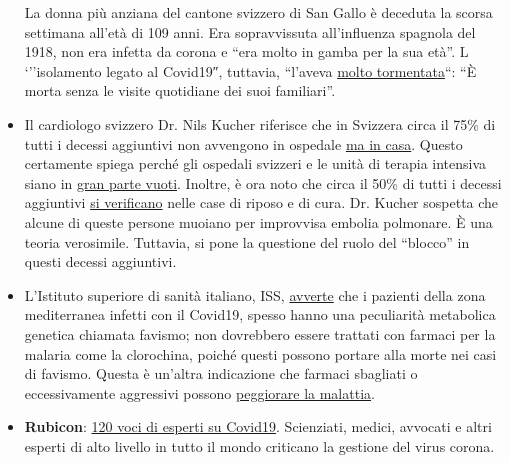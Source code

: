 \begin{itemize}
  La donna più anziana del cantone svizzero di San Gallo è deceduta la
  scorsa settimana all'età di 109 anni. Era sopravvissuta all'influenza
  spagnola del 1918, non era infetta da corona e ``era molto in gamba
  per la sua età''. L `''isolamento legato al Covid19″, tuttavia,
  ``l'aveva
  \href{https://swprs.files.wordpress.com/2020/04/tagblatt-109.jpg}{molto
  tormentata}``: ``È morta senza le visite quotidiane dei suoi
  familiari''.
\item
  Il cardiologo svizzero Dr. Nils Kucher riferisce che in ​​Svizzera
  circa il 75\% di tutti i decessi aggiuntivi non avvengono in ospedale
  \href{https://www.tagesspiegel.de/wissen/woran-sterben-corona-patienten-wirklich-ein-schweizer-forscher-macht-hoffnung-im-kampf-gegen-covid-19/25750666.html}{ma
  in casa}. Questo certamente spiega perché gli ospedali svizzeri e le
  unità di terapia intensiva siano in
  \href{https://swprs.files.wordpress.com/2020/04/intensivbettenbelegung-schweiz-2020-04-14.png}{gran
  parte vuoti}. Inoltre, è ora noto che circa il 50\% di tutti i decessi
  aggiuntivi
  \href{https://www.nzz.ch/zuerich/coronavirus-zuerich-aendert-nun-das-testregime-in-heimenauch-viele-aeltere-covid-19-infizierte-entwickeln-keine-symptome-zuerich-aendert-nun-das-testregime-in-heimen-ld.1552089}{si
  verificano} nelle case di riposo e di cura. Dr. Kucher sospetta che
  alcune di queste persone muoiano per improvvisa embolia polmonare. È
  una teoria verosimile. Tuttavia, si pone la questione del ruolo del
  ``blocco'' in questi decessi aggiuntivi.
\item
  L'Istituto superiore di sanità italiano, ISS,
  \href{https://www.iss.it/en/rapporti-covid-19/-/asset_publisher/btw1J82wtYzH/content/id/5334891}{avverte}
  che i pazienti della zona mediterranea infetti con il Covid19, spesso
  hanno una peculiarità metabolica genetica chiamata favismo; non
  dovrebbero essere trattati con farmaci per la malaria come la
  clorochina, poiché questi possono portare alla morte nei casi di
  favismo. Questa è un'altra indicazione che farmaci sbagliati o
  eccessivamente aggressivi possono
  \href{https://www.sciencedaily.com/releases/2020/02/200206110703.htm}{peggiorare
  la malattia}.
\item
  \textbf{Rubicon}:
  \href{https://www.rubikon.news/artikel/120-expertenstimmen-zu-corona}{120
  voci di esperti su Covid19}. Scienziati, medici, avvocati e altri
  esperti di alto livello in tutto il mondo criticano la gestione del
  virus corona.
\end{itemize}

